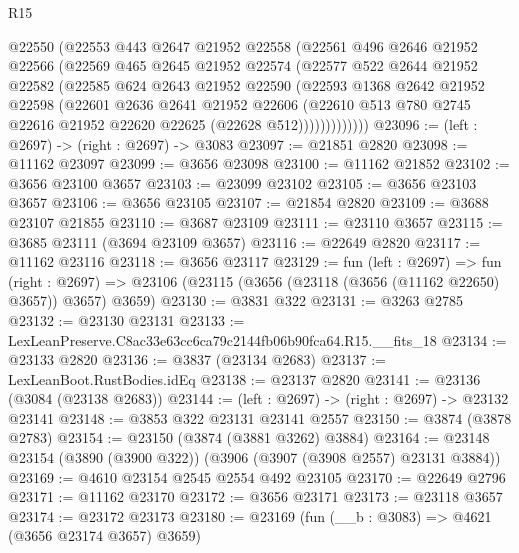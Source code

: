 \begin{lexlean}{R15}
\begin{coremodule}
            @22550
            (@22553
              @443
              @2647
              @21952
              @22558
              (@22561
                @496
                @2646
                @21952
                @22566
                (@22569
                  @465
                  @2645
                  @21952
                  @22574
                  (@22577
                    @522
                    @2644
                    @21952
                    @22582
                    (@22585
                      @624
                      @2643
                      @21952
                      @22590
                      (@22593
                        @1368
                        @2642
                        @21952
                        @22598
                        (@22601
                          @2636
                          @2641
                          @21952
                          @22606
                          (@22610
                            @513
                            @780
                            @2745
                            @22616
                            @21952
                            @22620
                            @22625
                            (@22628 @512)))))))))))))
@23096 := (left : @2697) -> (right : @2697) -> @3083
@23097 := @21851 @2820
@23098 := @11162 @23097
@23099 := @3656 @23098
@23100 := @11162 @21852
@23102 := @3656 @23100 @3657
@23103 := @23099 @23102
@23105 := @3656 @23103 @3657
@23106 := @3656 @23105
@23107 := @21854 @2820
@23109 := @3688 @23107 @21855
@23110 := @3687 @23109
@23111 := @23110 @3657
@23115 := @3685 @23111 (@3694 @23109 @3657)
@23116 := @22649 @2820
@23117 := @11162 @23116
@23118 := @3656 @23117
@23129 := fun (left : @2697) =>
  fun (right : @2697) => @23106 (@23115 (@3656 (@23118 (@3656 (@11162 @22650) @3657)) @3657) @3659)
@23130 := @3831 @322
@23131 := @3263 @2785
@23132 := @23130 @23131
@23133 := LexLeanPreserve.C8ac33e63cc6ca79c2144fb06b90fca64.R15.__fits_18
@23134 := @23133 @2820
@23136 := @3837 (@23134 @2683)
@23137 := LexLeanBoot.RustBodies.idEq
@23138 := @23137 @2820
@23141 := @23136 (@3084 (@23138 @2683))
@23144 := (left : @2697) -> (right : @2697) -> @23132 @23141
@23148 := @3853 @322 @23131 @23141 @2557
@23150 := @3874 (@3878 @2783)
@23154 := @23150 (@3874 (@3881 @3262) @3884)
@23164 := @23148 @23154 (@3890 (@3900 @322)) (@3906 (@3907 (@3908 @2557) @23131 @3884))
@23169 := @4610 @23154 @2545 @2554 @492 @23105
@23170 := @22649 @2796
@23171 := @11162 @23170
@23172 := @3656 @23171
@23173 := @23118 @3657
@23174 := @23172 @23173
@23180 := @23169 (fun (__b : @3083) => @4621 (@3656 @23174 @3657) @3659)

\end{coremodule}
\end{lexlean}
